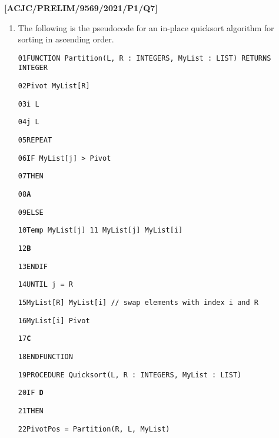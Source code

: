 \quad{} 
\item \textbf{{[}ACJC/PRELIM/9569/2021/P1/Q7{]} }
\begin{enumerate}
\item The following is the pseudocode for an in-place quicksort algorithm
for sorting in ascending order.

\noindent %
\noindent\begin{minipage}[t]{1\columnwidth}%
\texttt{01\qquad{}FUNCTION Partition(L, R : INTEGERS, MyList : LIST)
RETURNS INTEGER }

\texttt{02\qquad{}\qquad{}Pivot \textleftarrow{} MyList{[}R{]} }

\texttt{03\qquad{}\qquad{}i \textleftarrow{} L }

\texttt{04\qquad{}\qquad{}j \textleftarrow{} L }

\texttt{05\qquad{}\qquad{}REPEAT }

\texttt{06\qquad{}\qquad{}\qquad{}IF MyList{[}j{]} > Pivot }

\texttt{07\qquad{}\qquad{}\qquad{}\qquad{}THEN }

\texttt{08\qquad{}\qquad{}\qquad{}\qquad{}\qquad{}}\texttt{\textbf{A}}\texttt{ }

\texttt{09\qquad{}\qquad{}\qquad{}\qquad{}ELSE }

\texttt{10\qquad{}\qquad{}\qquad{}\qquad{}Temp \textleftarrow{}
MyList{[}j{]} 11 MyList{[}j{]} \textleftarrow{} MyList{[}i{]} }

\texttt{12\qquad{}\qquad{}\qquad{}\qquad{}}\texttt{\textbf{B}}\texttt{ }

\texttt{13\qquad{}\qquad{}\qquad{}ENDIF }

\texttt{14\qquad{}\qquad{}UNTIL j = R }

\texttt{15\qquad{}\qquad{}MyList{[}R{]} \textleftarrow{} MyList{[}i{]}
// swap elements with index i and R }

\texttt{16\qquad{}\qquad{}MyList{[}i{]} \textleftarrow{} Pivot }

\texttt{17\qquad{}\qquad{}}\texttt{\textbf{C}}\texttt{ }

\texttt{18\qquad{}ENDFUNCTION }

\texttt{19\qquad{}PROCEDURE Quicksort(L, R : INTEGERS, MyList : LIST) }

\texttt{20\qquad{}\qquad{}IF }\texttt{\textbf{D}}\texttt{ }

\texttt{21\qquad{}\qquad{}\qquad{}THEN }

\texttt{22\qquad{}\qquad{}\qquad{}\qquad{}PivotPos = Partition(R,
L, MyList) }


\end{minipage}
\end{enumerate}
